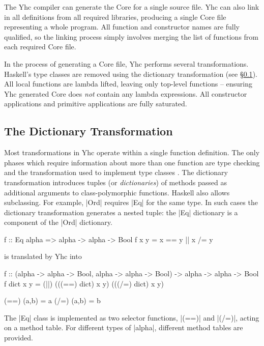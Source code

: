 The Yhc compiler can generate the Core for a single source file. Yhc can also link in all definitions from all required libraries, producing a single Core file representing a whole program. All function and constructor names are fully qualified, so the linking process simply involves merging the list of functions from each required Core file.

In the process of generating a Core file, Yhc performs several transformations. Haskell's type classes are removed using the dictionary transformation (see \S\ref{sec:dictionary_transformation}). All local functions are lambda lifted, leaving only top-level functions -- ensuring Yhc generated Core does \textit{not} contain any lambda expressions. All constructor applications and primitive applications are fully saturated.


\subsection{The Dictionary Transformation}
\label{sec:dictionary_transformation}

Most transformations in Yhc operate within a single function definition. The only phases which require information about more than one function are type checking and the transformation used to implement type classes \citep{wadler:type_classes}. The dictionary transformation introduces tuples (or \textit{dictionaries}) of methods passed as additional arguments to class-polymorphic functions. Haskell also allows subclassing. For example, |Ord| requires |Eq| for the same type. In such cases the dictionary transformation generates a nested tuple: the |Eq| dictionary is a component of the |Ord| dictionary.

\begin{example}
\label{ex:dictionary}
\begin{code}
f :: Eq alpha => alpha -> alpha -> Bool
f x y = x == y || x /= y
\end{code}

\noindent is translated by Yhc into

\begin{code}
f :: (alpha -> alpha -> Bool, alpha -> alpha -> Bool) -> alpha -> alpha -> Bool
f dict x y = (||) (((==) dict) x y) (((/=) dict) x y)

(==) (a,b) = a
(/=) (a,b) = b
\end{code}

The |Eq| class is implemented as two selector functions, |(==)| and |(/=)|, acting on a method table. For different types of |alpha|, different method tables are provided.
\end{example}

